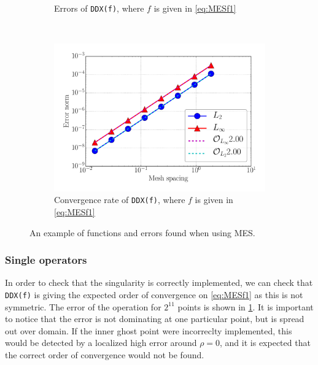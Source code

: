 \begin{figure}[t!]
\begin{subfigure}[t]{0.45\textwidth}
        \caption{Errors of \texttt{DDX(f)}, where $f$ is given in \cref{eq:MESf1}}
        \label{fig:errorsMES}
    \end{subfigure}
    ~
    \begin{subfigure}[t]{0.45\textwidth}
        \centering
        \includegraphics[width=1.0\textwidth]{fig/conv}
        \caption{Convergence rate of \texttt{DDX(f)}, where $f$ is given in \cref{eq:MESf1}}
    \end{subfigure}
    \caption{An example of functions and errors found when using MES.}
\end{figure}

\subsubsection{Single operators}
%
In order to check that the singularity is correctly implemented, we can check that \texttt{DDX(f)} is giving the expected order of convergence on \cref{eq:MESf1} as this is not symmetric.
The error of the operation for $2^{11}$ points is shown in \cref{fig:errorsMES}.
It is important to notice that the error is not dominating at one particular point, but is spread out over domain.
If the inner ghost point were incorreclty implemented, this would be detected by a localized high error around $\rho=0$, and it is expected that the correct order of convergence would not be found.

